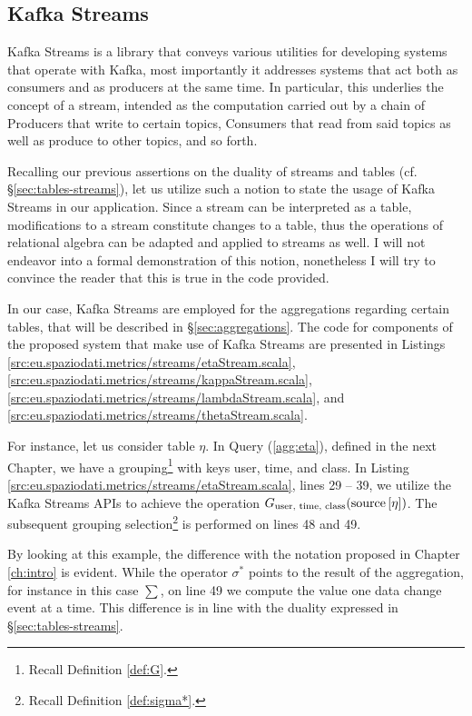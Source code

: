 \subsection{Kafka Streams}
\label{sec:kafka-streams}

Kafka Streams is a library that conveys various utilities for developing systems that operate with Kafka, most importantly it addresses systems that act both as consumers and as producers at the same time.
In particular, this underlies the concept of a stream, intended as the computation carried out by a chain of Producers that write to certain topics, Consumers that read from said topics as well as produce to other topics, and so forth.

Recalling our previous assertions on the duality of streams and tables (cf. \S \ref{sec:tables-streams}), let us utilize such a notion to state the usage of Kafka Streams in our application.
Since a stream can be interpreted as a table, modifications to a stream constitute changes to a table, thus the operations of relational algebra can be adapted and applied to streams as well.
I will not endeavor into a formal demonstration of this notion, nonetheless I will try to convince the reader that this is true in the code provided.

In our case, Kafka Streams are employed for the aggregations regarding certain tables, that will be described in \S \ref{sec:aggregations}.
The code for components of the proposed system that make use of Kafka Streams are presented in Listings \ref{src:eu.spaziodati.metrics/streams/etaStream.scala}, \ref{src:eu.spaziodati.metrics/streams/kappaStream.scala},
\ref{src:eu.spaziodati.metrics/streams/lambdaStream.scala}, and
\ref{src:eu.spaziodati.metrics/streams/thetaStream.scala}.

For instance, let us consider table $\eta$. In Query (\ref{agg:eta}), defined in the next Chapter, we have a grouping\footnote{%
	Recall Definition \ref{def:G}.
} with keys user, time, and class. In Listing \ref{src:eu.spaziodati.metrics/streams/etaStream.scala}, lines 29 -- 39, we utilize the Kafka Streams APIs to achieve the operation $G_{\text{user, time, class}}(\text{source}\left[{\eta}\right])$.
The subsequent grouping selection\footnote{%
	Recall Definition \ref{def:sigma*}.
} is performed on lines 48 and 49.

By looking at this example, the difference with the notation proposed in Chapter \ref{ch:intro} is evident.
While the operator $\sigma^*$ points to the result of the aggregation, for instance in this case $\sum$, on line 49 we compute the value one data change event at a time.
This difference is in line with the duality expressed in \S \ref{sec:tables-streams}.


